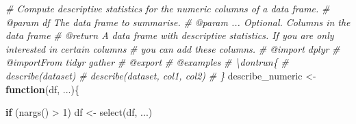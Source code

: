 \documentclass[
]{article}
\newenvironment{Shaded}{\begin{snugshade}}{\end{snugshade}}
\newcommand{\CommentTok}[1]{\textcolor[rgb]{0.56,0.35,0.01}{\textit{#1}}}
\newcommand{\ControlFlowTok}[1]{\textcolor[rgb]{0.13,0.29,0.53}{\textbf{#1}}}
\newcommand{\DecValTok}[1]{\textcolor[rgb]{0.00,0.00,0.81}{#1}}
\newcommand{\FunctionTok}[1]{\textcolor[rgb]{0.00,0.00,0.00}{#1}}
\newcommand{\NormalTok}[1]{#1}
\newcommand{\OtherTok}[1]{\textcolor[rgb]{0.56,0.35,0.01}{#1}}
\newcommand{\SpecialCharTok}[1]{\textcolor[rgb]{0.00,0.00,0.00}{#1}}
\begin{document}
\begin{Shaded}
\begin{Highlighting}[]
\CommentTok{\#\textquotesingle{} Compute descriptive statistics for the numeric columns of a data frame.}
\CommentTok{\#\textquotesingle{} @param df The data frame to summarise.}
\CommentTok{\#\textquotesingle{} @param ... Optional. Columns in the data frame}
\CommentTok{\#\textquotesingle{} @return A data frame with descriptive statistics. If you are only interested in certain columns}
\CommentTok{\#\textquotesingle{} you can add these columns.}
\CommentTok{\#\textquotesingle{} @import dplyr}
\CommentTok{\#\textquotesingle{} @importFrom tidyr gather}
\CommentTok{\#\textquotesingle{} @export}
\CommentTok{\#\textquotesingle{} @examples}
\CommentTok{\#\textquotesingle{} \textbackslash{}dontrun\{}
\CommentTok{\#\textquotesingle{} describe(dataset)}
\CommentTok{\#\textquotesingle{} describe(dataset, col1, col2)}
\CommentTok{\#\textquotesingle{} \}}
\NormalTok{describe\_numeric }\OtherTok{\textless{}{-}} \ControlFlowTok{function}\NormalTok{(df, ...)\{}

  \ControlFlowTok{if}\NormalTok{ (}\FunctionTok{nargs}\NormalTok{() }\SpecialCharTok{\textgreater{}} \DecValTok{1}\NormalTok{) df }\OtherTok{\textless{}{-}} \FunctionTok{select}\NormalTok{(df, ...)}


\end{Highlighting}
\end{Shaded}
\end{document}
